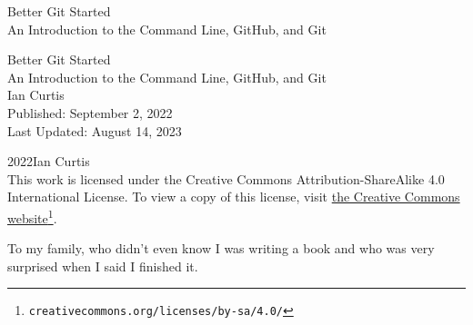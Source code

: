 \documentclass[twoside,10pt,]{book}
\newcommand{\titlepagefont}{\relax}
\begin{document}
\raggedbottom
\frontmatter
\thispagestyle{empty}
{\titlepagefont\centering
\vspace*{0.28\textheight}
{\Huge Better Git Started}\\[2\baselineskip]
{\LARGE An Introduction to the Command Line, GitHub, and Git}\\
}
\clearpage
\thispagestyle{empty}
\null%
\clearpage
\thispagestyle{empty}
{\titlepagefont\centering
\vspace*{0.14\textheight}
{\Huge Better Git Started}\\[\baselineskip]
{\LARGE An Introduction to the Command Line, GitHub, and Git}\\[3\baselineskip]
{\Large Ian Curtis}\\[3\baselineskip]
{\Large Published: September 2, 2022}\\[3\baselineskip]
{\Large Last Updated: August 14, 2023}\\}
\clearpage
\thispagestyle{empty}
\label{colophon-frontmatter-b}{}\hypertarget{colophon-frontmatter-b}{}
\noindent\textcopyright{}2022\quad{}Ian Curtis\\[0.5\baselineskip]
This work is licensed under the Creative Commons Attribution-ShareAlike 4.0 International License. To view a copy of this license, visit \href{http://creativecommons.org/licenses/by-sa/4.0/}{the Creative Commons website}\footnote{\nolinkurl{creativecommons.org/licenses/by-sa/4.0/}\label{fn-frontmatter-b-a-c-b}}.\par\medskip
{}
\null\clearpage
\cleardoublepage
\thispagestyle{empty}
\begin{center}\Large%
To my family, who didn't even know I was writing a book and who was very surprised when I said I finished it.%
\end{center}
\clearpage
\end{document}
